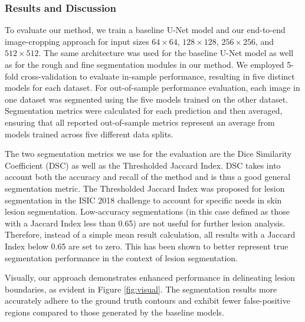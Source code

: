 \subsubsection{Results and Discussion}

To evaluate our method, we train a baseline U-Net model and our end-to-end image-cropping approach for input sizes $64 \times 64$, $128 \times 128$, $256 \times 256$, and $512 \times 512$. The same architecture was used for the baseline U-Net model as well as for the rough and fine segmentation modules in our method. We employed 5-fold cross-validation to evaluate in-sample performance, resulting in five distinct models for each dataset. For out-of-sample performance evaluation, each image in one dataset was segmented using the five models trained on the other dataset. Segmentation metrics were calculated for each prediction and then averaged, ensuring that all reported out-of-sample metrics represent an average from models trained across five different data splits.

The two segmentation metrics we use for the evaluation are the Dice Similarity Coefficient (DSC) as well as the Thresholded Jaccard Index. DSC takes into account both the accuracy and recall of the method and is thus a good general segmentation metric. The Thresholded Jaccard Index was proposed for lesion segmentation in the ISIC 2018 challenge \cite{codellaSkinLesionAnalysis2018} to account for specific needs in skin lesion segmentation. Low-accuracy segmentations (in this case defined as those with a Jaccard Index less than 0.65) are not useful for further lesion analysis. Therefore, instead of a simple mean result calculation, all results with a Jaccard Index below 0.65 are set to zero. This has been shown to better represent true segmentation performance in the context of lesion segmentation. 

Visually, our approach demonstrates enhanced performance in delineating lesion boundaries, as evident in Figure \ref{fig:visual}. The segmentation results more accurately adhere to the ground truth contours and exhibit fewer false-positive regions compared to those generated by the baseline models.

